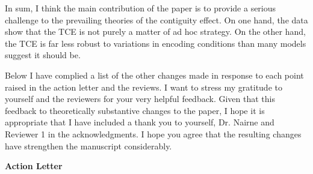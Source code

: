 \documentclass[12pt]{article}
\begin{document}
In sum, I think the main contribution of the paper is to provide a serious challenge to the prevailing theories of the contiguity effect. On one hand, the data show that the TCE is not purely a matter of ad hoc strategy. On the other hand, the TCE is far less robust to variations in encoding conditions than many models suggest it should be. 

Below I have complied a list of the other changes made in response to each point raised in the action letter and the reviews. I want to stress my gratitude to yourself and the reviewers for your very helpful feedback. Given that this feedback to theoretically substantive changes to the paper, I hope it is appropriate that I have included a thank you to yourself, Dr. Nairne and Reviewer 1 in the acknowledgments. I hope you agree that the resulting changes have strengthen the manuscript considerably.

\vspace{20pt}

\textbf{\large{Action Letter}}
\end{document}
